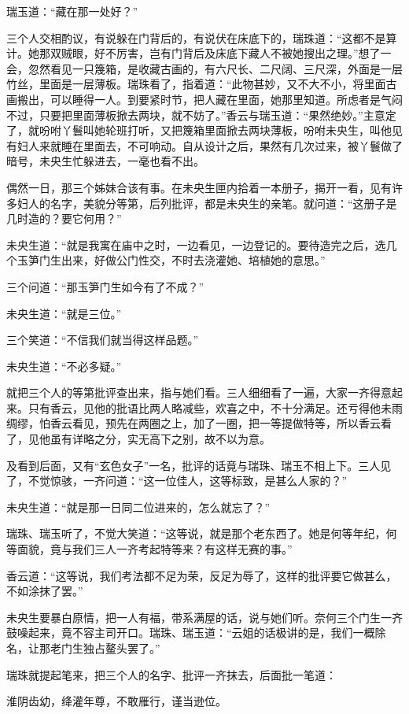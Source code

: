 \documentclass[a4paper,12pt,UTF8,twoside]{ctexbook}
\begin{document}
瑞玉道：“藏在那一处好？”

三个人交相酌议，有说躲在门背后的，有说伏在床底下的，瑞珠道：“这都不是算计。她那双贼眼，好不厉害，岂有门背后及床底下藏人不被她搜出之理。”想了一会，忽然看见一只篾箱，是收藏古画的，有六尺长、二尺阔、三尺深，外面是一层竹丝，里面是一层薄板。瑞珠看了，指着道：“此物甚妙，又不大不小，将里面古画搬出，可以睡得一人。到要紧时节，把人藏在里面，她那里知道。所虑者是气闷不过，只要把里面薄板掀去两块，就不妨了。”香云与瑞玉道：“果然绝妙。”主意定了，就吩咐丫鬟叫她轮班打听，又把篾箱里面掀去两块薄板，吩咐未央生，叫他见有妇人来就睡在里面去，不可响动。自从设计之后，果然有几次过来，被丫鬟做了暗号，未央生忙躲进去，一毫也看不出。

偶然一日，那三个姊妹合该有事。在未央生匣内拾着一本册子，揭开一看，见有许多妇人的名字，美貌分等第，后列批评，都是未央生的亲笔。就问道：“这册子是几时造的？要它何用？”

未央生道：“就是我寓在庙中之时，一边看见，一边登记的。要待造完之后，选几个玉笋门生出来，好做公门性交，不时去浇灌她、培植她的意思。”

三个问道：“那玉笋门生如今有了不成？”

未央生道：“就是三位。”

三个笑道：“不信我们就当得这样品题。”

未央生道：“不必多疑。”

就把三个人的等第批评查出来，指与她们看。三人细细看了一遍，大家一齐得意起来。只有香云，见他的批语比两人略减些，欢喜之中，不十分满足。还亏得他未雨绸缪，怕香云看见，预先在两圈之上，加了一圈，把一等提做特等，所以香云看了，见他虽有详略之分，实无高下之别，故不以为意。

及看到后面，又有“玄色女子”一名，批评的话竟与瑞珠、瑞玉不相上下。三人见了，不觉惊骇，一齐问道：“这一位佳人，这等标致，是甚么人家的？”

未央生道：“就是那一日同二位进来的，怎么就忘了？”

瑞珠、瑞玉听了，不觉大笑道：“这等说，就是那个老东西了。她是何等年纪，何等面貌，竟与我们三人一齐考起特等来？有这样无赛的事。”

香云道：“这等说，我们考法都不足为荣，反足为辱了，这样的批评要它做甚么，不如涂抹了罢。”

未央生要暴白原情，把一人有福，带系满屋的话，说与她们听。奈何三个门生一齐鼓噪起来，竟不容主司开口。瑞珠、瑞玉道：“云姐的话极讲的是，我们一概除名，让那老门生独占鳌头罢了。”

瑞珠就提起笔来，把三个人的名字、批评一齐抹去，后面批一笔道：

淮阴齿幼，绛灌年尊，不敢雁行，谨当逊位。
\end{document}
